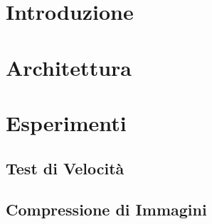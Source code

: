 \documentclass[a4paper,11pt,oneside, table]{article}
\begin{document}
    \printindex
    \tableofcontents
    \renewcommand{\baselinestretch}{1.5}

\section{Introduzione}


\section{Architettura}


\section{Esperimenti}


\subsection{Test di Velocit\`a}


\subsection{Compressione di Immagini}
\end{document}
